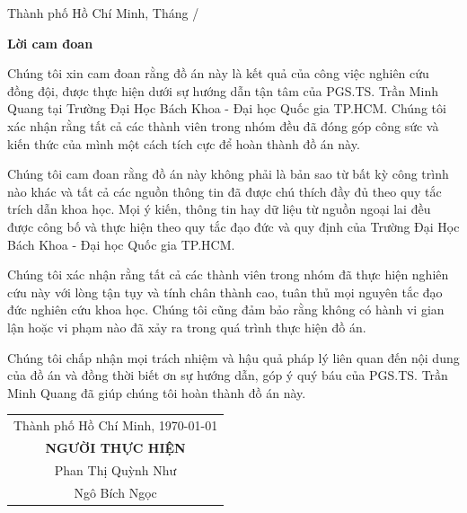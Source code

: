 \documentclass[12pt, a4paper]{report}
\theoremstyle{definition}
\newenvironment{declaration}{
	\begin{center}
	  {\bfseries Lời cam đoan}
	\end{center}
	\quotation
  }{}
\newcommand{\Proc}{PGS.TS. Trần Minh Quang }
\newcommand{\Uni}{Trường Đại Học Bách Khoa - Đại học Quốc gia TP.HCM}
\begin{document}
\begin{titlepage}
\begin{table}[h]
\begin{tabular}{rll}
\end{tabular}
\end{table}
\vspace{1cm}

\begin{center}
{\large Thành phố Hồ Chí Minh, Tháng \the\month/\the\year}
\end{center}
\end{titlepage}



\begin{declaration}

Chúng tôi xin cam đoan rằng đồ án này là kết quả của công việc nghiên cứu đồng đội, được thực hiện dưới sự hướng dẫn tận tâm của \Proc tại \Uni. Chúng tôi xác nhận rằng tất cả các thành viên trong nhóm đều đã đóng góp công sức và kiến thức của mình một cách tích cực để hoàn thành đồ án này.

Chúng tôi cam đoan rằng đồ án này không phải là bản sao từ bất kỳ công trình nào khác và tất cả các nguồn thông tin đã được chú thích đầy đủ theo quy tắc trích dẫn khoa học. Mọi ý kiến, thông tin hay dữ liệu từ nguồn ngoại lai đều được công bố và thực hiện theo quy tắc đạo đức và quy định của \Uni.

Chúng tôi xác nhận rằng tất cả các thành viên trong nhóm đã thực hiện nghiên cứu này với lòng tận tụy và tính chân thành cao, tuân thủ mọi nguyên tắc đạo đức nghiên cứu khoa học. Chúng tôi cũng đảm bảo rằng không có hành vi gian lận hoặc vi phạm nào đã xảy ra trong quá trình thực hiện đồ án.

Chúng tôi chấp nhận mọi trách nhiệm và hậu quả pháp lý liên quan đến nội dung của đồ án và đồng thời biết ơn sự hướng dẫn, góp ý quý báu của \Proc  đã giúp chúng tôi hoàn thành đồ án này.

\begin{flushright}

    \begin{tabular}{@{}c@{}}
    Thành phố Hồ Chí Minh, \today \\
    \textbf{NGƯỜI THỰC HIỆN} \\
    Phan Thị Quỳnh Như \\
    Ngô Bích Ngọc
    \end{tabular}

\end{flushright}
\end{declaration}

\newpage
\end{document}
